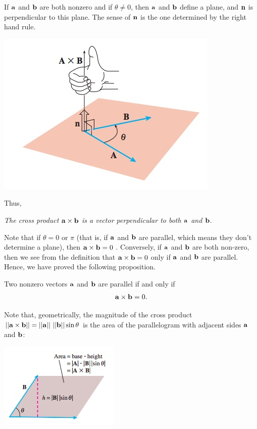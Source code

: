 \documentclass[12pt,letterpaper,reqno]{article}
\numberwithin{equation}{section}
\newcommand{\ti}[1]{\textit{#1}}
\begin{document}
If ${\bf a}$ and ${\bf b}$ are both nonzero and if $\theta \neq 0$, then ${\bf a}$ and ${\bf b}$ define a plane, and ${\bf n}$ is perpendicular to this plane. The sense of ${\bf n}$ is the one determined by the right hand rule. 
\begin{center}
	\includegraphics[scale=0.5]{figures_mvc/cross_product}
\end{center}
Thus, 
\begin{center}
	\ti{The cross product ${\bf a} \times {\bf b}$ is a vector perpendicular to both ${\bf a}$ and ${\bf b}$}.
\end{center}

Note that if $\theta=0$ or $\pi$ (that is, if ${\bf a}$ and ${\bf b}$ are parallel, which means they don't determine a plane), then ${\bf a} \times {\bf b}=0$ . Conversely, if ${\bf a}$ and ${\bf b}$ are both non-zero, then we see from the definition that ${\bf a} \times {\bf b}=0$ only if ${\bf a}$ and ${\bf b}$ are parallel. Hence, we have proved the following proposition.

\begin{prop}
	Two nonzero vectors ${\bf a}$ and ${\bf b}$ are parallel if and only if 
	\begin{align*}
		{\bf a} \times {\bf b}=0.
	\end{align*}
\end{prop}

Note that, geometrically, the magnitude of the cross product $||{\bf a} \times {\bf b}||=||{\bf a}|| \ ||{\bf b}||\sin\theta$ is the area of the parallelogram with adjacent sides ${\bf a}$ and ${\bf b}$:
\begin{center}
	\includegraphics[scale=0.5]{figures_mvc/cross_product_area_of_parallelogram}
\end{center}
\end{document}
